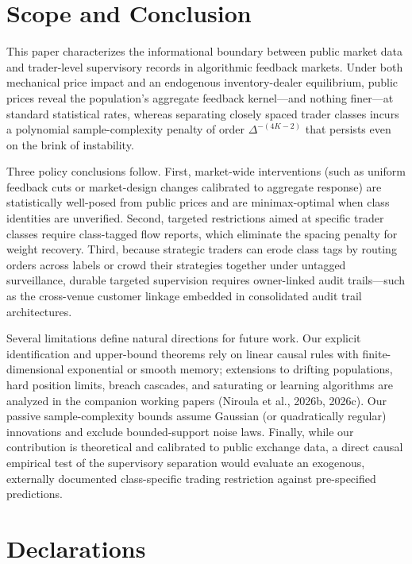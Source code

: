 \documentclass[11pt,letterpaper]{article}
\theoremstyle{definition}
\begin{document}
\section{Scope and Conclusion}\label{sec:conclusion}

This paper characterizes the informational boundary between public market data and trader-level supervisory records in algorithmic feedback markets. Under both mechanical price impact and an endogenous inventory-dealer equilibrium, public prices reveal the population's aggregate feedback kernel—and nothing finer—at standard statistical rates, whereas separating closely spaced trader classes incurs a polynomial sample-complexity penalty of order $\Delta^{-(4K-2)}$ that persists even on the brink of instability.

Three policy conclusions follow. First, market-wide interventions (such as uniform feedback cuts or market-design changes calibrated to aggregate response) are statistically well-posed from public prices and are minimax-optimal when class identities are unverified. Second, targeted restrictions aimed at specific trader classes require class-tagged flow reports, which eliminate the spacing penalty for weight recovery. Third, because strategic traders can erode class tags by routing orders across labels or crowd their strategies together under untagged surveillance, durable targeted supervision requires owner-linked audit trails—such as the cross-venue customer linkage embedded in consolidated audit trail architectures.

Several limitations define natural directions for future work. Our explicit identification and upper-bound theorems rely on linear causal rules with finite-dimensional exponential or smooth memory; extensions to drifting populations, hard position limits, breach cascades, and saturating or learning algorithms are analyzed in the companion working papers (Niroula et al., 2026b, 2026c). Our passive sample-complexity bounds assume Gaussian (or quadratically regular) innovations and exclude bounded-support noise laws. Finally, while our contribution is theoretical and calibrated to public exchange data, a direct causal empirical test of the supervisory separation would evaluate an exogenous, externally documented class-specific trading restriction against pre-specified predictions.

\section*{Declarations}
\end{document}
